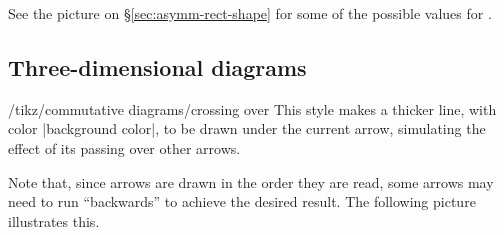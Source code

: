 \documentclass[a4paper]{ltxdoc}
\begin{document}
See the picture on \S\ref{sec:asymm-rect-shape} for some of the
possible values for .
\begin{codeexample}[]
\end{codeexample}

\subsection{Three-dimensional diagrams}
\label{sec:crossing-over}

\begin{stylekey}{/tikz/commutative diagrams/crossing over}
  This style makes a thicker line, with color |background color|, to
  be drawn under the current arrow, simulating the effect of its
  passing over other arrows.

\begin{codeexample}[]
\end{codeexample}
\end{stylekey}

Note that, since arrows are drawn in the order they are read, some
arrows may need to run ``backwards'' to achieve the desired result.
The following picture illustrates this.

\begin{codeexample}[]
\end{codeexample}
  
\end{document}
